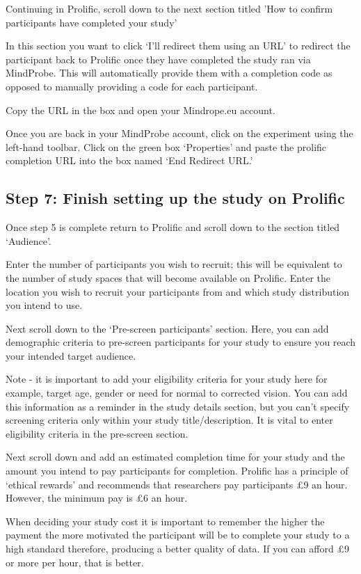 \documentclass[
  12pt,
]{book}
\begin{document}
Continuing in Prolific, scroll down to the next section titled 'How to confirm participants have completed your study'

In this section you want to click `I'll redirect them using an URL' to redirect the participant back to Prolific once they have completed the study ran via MindProbe. This will automatically provide them with a completion code as opposed to manually providing a code for each participant.

Copy the URL in the box and open your Mindrope.eu account.

Once you are back in your MindProbe account, click on the experiment using the left-hand toolbar. Click on the green box `Properties' and paste the prolific completion URL into the box named `End Redirect URL.'

\subsection{Step 7: Finish setting up the study on Prolific}\label{step-7-finish-setting-up-the-study-on-prolific}

Once step 5 is complete return to Prolific and scroll down to the section titled `Audience'.

Enter the number of participants you wish to recruit; this will be equivalent to the number of study spaces that will become available on Prolific. Enter the location you wish to recruit your participants from and which study distribution you intend to use.

Next scroll down to the `Pre-screen participants' section. Here, you can add demographic criteria to pre-screen participants for your study to ensure you reach your intended target audience.

Note - it is important to add your eligibility criteria for your study here for example, target age, gender or need for normal to corrected vision. You can add this information as a reminder in the study details section, but you can't specify screening criteria only within your study title/description. It is vital to enter eligibility criteria in the pre-screen section.

Next scroll down and add an estimated completion time for your study and the amount you intend to pay participants for completion. Prolific has a principle of `ethical rewards' and recommends that researchers pay participants £9 an hour. However, the minimum pay is £6 an hour.

When deciding your study cost it is important to remember the higher the payment the more motivated the participant will be to complete your study to a high standard therefore, producing a better quality of data. If you can afford £9 or more per hour, that is better.
\end{document}
